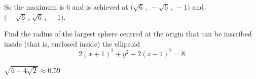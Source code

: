 \begin{solution}
\begin{itemize}
\end{itemize}
So the maximum is $6$ and is achieved at 
$\big(\sqrt{6}\,,\,-\sqrt{6}\,,\,-1\big)$ and 
$\big(-\sqrt{6}\,,\,\sqrt{6}\,,\,-1\big)$.
\end{solution}

\begin{question}[M200 2011D] %
Find the radius of the largest sphere centred at the origin that can be inscribed inside
(that is, enclosed inside) the ellipsoid
\begin{equation*}
2(x+1)^2 + y^2 + 2(z-1)^2 =8
\end{equation*}
\end{question}

%

\begin{answer}
$\sqrt{6-4\sqrt{2}}\approx 0.59$
\end{answer}

